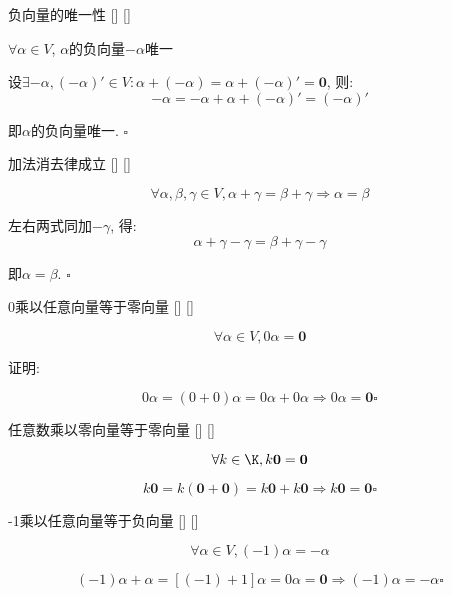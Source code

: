 \documentclass[UTF8]{ctexart}
\begin{document}
		\begin{ppt}
			[]
			{负向量的唯一性}
			[]
			[]

			$\forall \alpha \in V$, $\alpha$的负向量$-\alpha$唯一
		
		\end{ppt}
        \begin{prf}设$\exists -\alpha, (-\alpha)' \in V: \alpha+ (-\alpha)= \alpha + (-\alpha)'=\mathbf{0}$, 则: 
			$$-\alpha= -\alpha + \alpha + (-\alpha)'=(-\alpha)'$$
			
			即$\alpha$的负向量唯一. $\square$ 
        \end{prf}
		
		\begin{ppt}
			[]
			{加法消去律成立}
			[]
			[]

			$$\forall \alpha, \beta, \gamma \in V, \alpha +\gamma = \beta +\gamma \Longrightarrow \alpha =\beta$$
		\end{ppt}
        \begin{prf}
            左右两式同加$-\gamma$, 得: \[\alpha +\gamma -\gamma = \beta +\gamma -\gamma\]
			
			即$\alpha =\beta$. $\square$ 
         \end{prf}
		
		\begin{ppt}
			[]
			{0乘以任意向量等于零向量}
			[]
			[]

			$$\forall \alpha \in V, 0\alpha =\mathbf{0}$$
		\end{ppt}
        \begin{prf}
		证明: 
		
		 	$$0\alpha = (0+0)\alpha = 0\alpha + 0\alpha \Longrightarrow 0\alpha = \mathbf{0}\square$$
        \end{prf}
		
		\begin{ppt}
			[]
			{任意数乘以零向量等于零向量}
			[]
			[]

			$$\forall k \in \K, k\mathbf{0}=\mathbf{0}$$
		\end{ppt}
        \begin{prf}
            \[k\mathbf{0}=k(\mathbf{0}+\mathbf{0})=k\mathbf{0}+k\mathbf{0}\Longrightarrow k\mathbf{0}=\mathbf{0}\square\]
        \end{prf}
		
		\begin{ppt}
			[]
			{-1乘以任意向量等于负向量}
			[]
			[]

			$$\forall \alpha \in V, (-1)\alpha=-\alpha$$
		\end{ppt}
        \begin{prf}
            \[(-1)\alpha+\alpha=[(-1)+1]\alpha=0\alpha=\mathbf{0}\Longrightarrow (-1)\alpha=-\alpha\square\]
        \end{prf}
		
\end{document}
